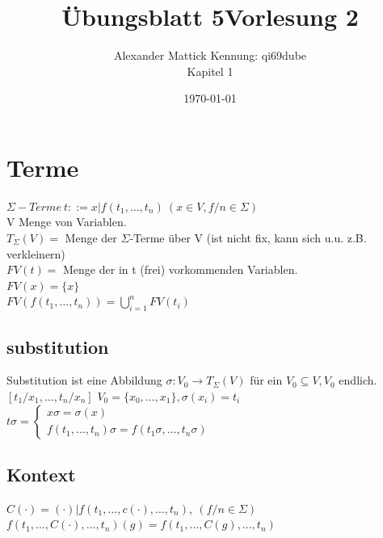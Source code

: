 \documentclass{article}
\title{Übungsblatt 5}
\author{
Alexander Mattick Kennung: qi69dube\\
Kapitel 1
}
\date{\today}
\title{Vorlesung 2}
\theoremstyle{definition}
\begin{document}
	\tableofcontents
	\newpage
	\maketitle
	\section{Terme}
	$\Sigma-Terme\ t::= x| f(t_1,\dots,t_n)\ (x\in V, f/n\in\Sigma)$\\
	V Menge von Variablen.\\
	$T_\Sigma(V) =$ Menge der $\Sigma$-Terme über V (ist nicht fix, kann sich u.u. z.B. verkleinern)\\
	$FV(t) = $ Menge der in t (frei) vorkommenden Variablen.\\
	$FV(x) = \{x\}$\\
	$FV(f(t_1,\dots,t_n)) = \bigcup\limits^n_{i=1} FV(t_i)$\\
	\subsection{substitution}
	Substitution ist eine Abbildung $\sigma: V_0\to T_\Sigma(V)$ für ein $V_0\subseteq V, V_0$ endlich.\\
	$[t_1/x_1,\dots,t_n/x_n]$ $V_0=\{x_0,\dots,x_1\}, \sigma(x_i)=t_i$
	$t\sigma = \begin{cases}x\sigma = \sigma(x)\\ f(t_1,\dots,t_n)\sigma = f(t_1\sigma,\dots,t_n\sigma)\end{cases}$
	\subsection{Kontext}
	$C(\cdot) = (\cdot)|f(t_1,\dots,c(\cdot),\dots,t_n), \ (f/n\in\Sigma)$\\
	$f(t_1,\dots,C(\cdot),\dots,t_n)(g)= f(t_1,\dots,C(g),\dots,t_n)$
\end{document}
